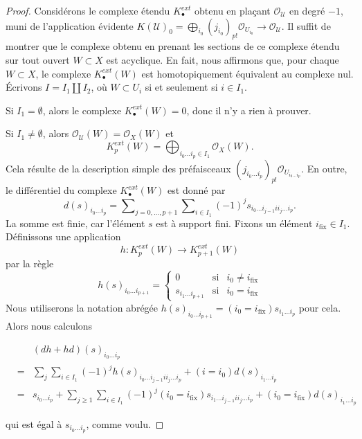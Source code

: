 \begin{proof}
Considérons le complexe étendu $K^{ext}_\bullet$ obtenu en plaçant $\mathcal{O}_\mathcal{U}$ en degré $-1$, muni de l'application évidente $K(\mathcal{U})_0 =
\bigoplus_{i_0} (j_{i_0})_{p!}\mathcal{O}_{U_{i_0}} \to
\mathcal{O}_\mathcal{U}$. Il suffit de montrer que le complexe obtenu en prenant les sections de ce complexe étendu sur tout ouvert $W \subset X$ est acyclique. En fait, nous affirmons que, pour chaque $W \subset X$, le complexe $K^{ext}_\bullet(W)$ est homotopiquement équivalent au complexe nul. Écrivons $I = I_1 \amalg I_2$, où $W \subset U_i$ si et seulement si $i \in I_1$.

\medskip\noindent
Si $I_1 = \emptyset$, alors le complexe $K^{ext}_\bullet(W) = 0$, donc il n'y a rien à prouver.

\medskip\noindent

Si $I_1 \not = \emptyset$, alors
$\mathcal{O}_\mathcal{U}(W) = \mathcal{O}_X(W)$
et
$$
K^{ext}_p(W) =
\bigoplus\nolimits_{i_0 \ldots i_p \in I_1} \mathcal{O}_X(W).
$$
Cela résulte de la description simple des préfaisceaux
$(j_{i_0 \ldots i_p})_{p!}\mathcal{O}_{U_{i_0 \ldots i_p}}$. En outre, le différentiel du complexe $K^{ext}_\bullet(W)$
est donné par
$$
d(s)_{i_0 \ldots i_p} =
\sum\nolimits_{j = 0, \ldots, p + 1} \sum\nolimits_{i \in I_1}
(-1)^j s_{i_0 \ldots i_{j - 1} i i_j \ldots i_p}.
$$
La somme est finie, car l'élément $s$ est à support fini. Fixons un élément $i_{\text{fix}} \in I_1$. Définissons une application
$$
h : K^{ext}_p(W) \longrightarrow K^{ext}_{p + 1}(W)
$$
par la règle
$$
h(s)_{i_0 \ldots i_{p + 1}} =
\left\{
\begin{matrix}
0 & \text{si} & i_0 \not = i_{\text{fix}} \\
s_{i_1 \ldots i_{p + 1}} & \text{si} & i_0 = i_{\text{fix}}
\end{matrix}
\right.
$$
Nous utiliserons la notation abrégée
$h(s)_{i_0 \ldots i_{p + 1}} = (i_0 = i_{\text{fix}}) s_{i_1 \ldots i_p}$
pour cela. Alors nous calculons

\begin{eqnarray*}
& & (dh + hd)(s)_{i_0 \ldots i_p} \\
& = &
\sum_j \sum_{i \in I_1} (-1)^j h(s)_{i_0 \ldots i_{j - 1} i i_j \ldots i_p}
+
(i = i_0) d(s)_{i_1 \ldots i_p} \\
& = &
s_{i_0 \ldots i_p} +
\sum_{j \geq 1}\sum_{i \in I_1}
(-1)^j (i_0 = i_{\text{fix}}) s_{i_1 \ldots i_{j - 1} i i_j \ldots i_p}
+
(i_0 = i_{\text{fix}}) d(s)_{i_1 \ldots i_p}
\end{eqnarray*}

qui est égal à $s_{i_0 \ldots i_p}$, comme voulu.

\end{proof}

